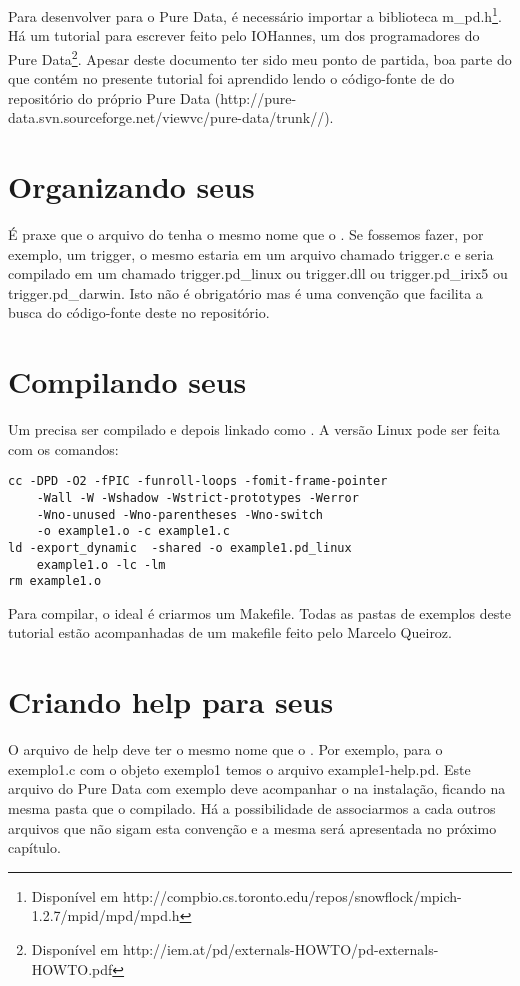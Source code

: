 Para desenvolver para o Pure Data, é necessário importar a biblioteca
m\_pd.h\footnote{Disponível em
http://compbio.cs.toronto.edu/repos/snowflock/mpich-1.2.7/mpid/mpd/mpd.h}. Há
um tutorial para escrever \externals feito pelo IOHannes, um dos programadores
do Pure Data\footnote{Disponível em
http://iem.at/pd/externals-HOWTO/pd-externals-HOWTO.pdf}. Apesar deste
documento ter sido meu ponto de partida, boa parte do que contém no presente
tutorial foi aprendido lendo o código-fonte de \externals do repositório do
próprio Pure Data
(http://pure-data.svn.sourceforge.net/viewvc/pure-data/trunk/\externals/).

\section{Organizando seus \externals}

É praxe que o arquivo do \external tenha o mesmo nome que o \external. Se
fossemos fazer, por exemplo, um trigger, o mesmo estaria em um arquivo chamado
trigger.c e seria compilado em um \external chamado trigger.pd\_linux ou
trigger.dll ou trigger.pd\_irix5 ou trigger.pd\_darwin. Isto não é obrigatório
mas é uma convenção que facilita a busca do código-fonte deste \external no
repositório.

\section{Compilando seus \externals}

Um \external precisa ser compilado e depois linkado como \external. A versão
Linux pode ser feita com os comandos:

\begin{lstlisting}
cc -DPD -O2 -fPIC -funroll-loops -fomit-frame-pointer 
	-Wall -W -Wshadow -Wstrict-prototypes -Werror 
	-Wno-unused -Wno-parentheses -Wno-switch 
	-o example1.o -c example1.c
ld -export_dynamic  -shared -o example1.pd_linux 
	example1.o -lc -lm
rm example1.o
\end{lstlisting}

Para compilar, o ideal é criarmos um Makefile. Todas as pastas de exemplos
deste tutorial estão acompanhadas de um makefile feito pelo Marcelo Queiroz.

\section{Criando help para seus \externals}

O arquivo de help deve ter o mesmo nome que o \external. Por exemplo, para o
exemplo1.c com o objeto exemplo1 temos o arquivo example1-help.pd. Este
arquivo do Pure Data com exemplo deve acompanhar o \external na instalação,
ficando na mesma pasta que o \external compilado.  Há a possibilidade de
associarmos a cada \external outros arquivos que não sigam esta convenção e a
mesma será apresentada no próximo capítulo.

